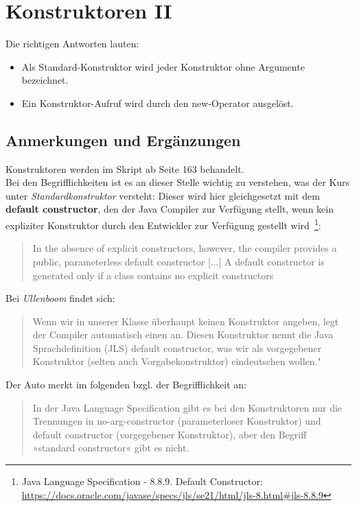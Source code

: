 \chapter{Konstruktoren II}\label{konstruktoren}

Die richtigen Antworten lauten:

\begin{itemize}
    \item Als Standard-Konstruktor wird jeder Konstruktor ohne Argumente bezeichnet.
    \item Ein Konstruktor-Aufruf wird durch den new-Operator ausgelöst.
\end{itemize}


\section*{Anmerkungen und Ergänzungen}

Konstruktoren werden im Skript ab Seite 163 behandelt.\\

Bei den Begrifflichkeiten ist es an dieser Stelle wichtig zu verstehen, was der Kurs unter \textit{Standardkonstruktor}
versteht: Dieser wird hier gleichgesetzt mit dem \textbf{default constructor}, den der Java Compiler zur Verfügung stellt,
wenn kein expliziter Konstruktor durch den Entwickler zur Verfügung gestellt wird~\footnote{
    Java Language Specification - 8.8.9. Default Constructor: \url{https://docs.oracle.com/javase/specs/jls/se21/html/jls-8.html#jls-8.8.9}
}:

\blockquote[{\cite[19 f.]{Blo17}}]{
    In the absence of explicit constructors, however, the compiler provides a public, parameterless default constructor [...]
    A default constructor is generated only if a class contains no explicit constructors
}

Bei \textit{Ullenboom} findet sich:

\blockquote[{\cite[515]{Ull12}}]{
    Wenn wir in unserer Klasse überhaupt keinen Konstruktor angeben, legt der Compiler automatisch einen an. Diesen
    Konstruktor nennt die Java Sprachdefinition (JLS) default constructor, was wir als vorgegebener Konstruktor
    (selten auch Vorgabekonstruktor) eindeutschen wollen."
}

Der Auto merkt im folgenden bzgl. der Begrifflichkeit an:

\blockquote[{\cite[516]{Ull12}}]{
    In der Java Language Specification gibt es bei den Konstruktoren nur die Trennungen in no-arg-constructor
    (parameterloser Konstruktor) und default constructor (vorgegebener Konstruktor), aber den Begriff
    »standard constructor« gibt es nicht.
}

